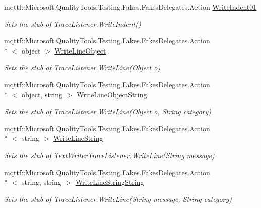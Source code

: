 \begin{DoxyCompactItemize}
mqttf\-::\-Microsoft.\-Quality\-Tools.\-Testing.\-Fakes.\-Fakes\-Delegates.\-Action \hyperlink{class_system_1_1_diagnostics_1_1_fakes_1_1_stub_console_trace_listener_aab8718be0e682706b76f757c57e13164}{Write\-Indent01}
\begin{DoxyCompactList}\small\item\em Sets the stub of Trace\-Listener.\-Write\-Indent()\end{DoxyCompactList}\item 
mqttf\-::\-Microsoft.\-Quality\-Tools.\-Testing.\-Fakes.\-Fakes\-Delegates.\-Action\\*
$<$ object $>$ \hyperlink{class_system_1_1_diagnostics_1_1_fakes_1_1_stub_console_trace_listener_a40de8646092fef37436942df0c258a27}{Write\-Line\-Object}
\begin{DoxyCompactList}\small\item\em Sets the stub of Trace\-Listener.\-Write\-Line(\-Object o)\end{DoxyCompactList}\item 
mqttf\-::\-Microsoft.\-Quality\-Tools.\-Testing.\-Fakes.\-Fakes\-Delegates.\-Action\\*
$<$ object, string $>$ \hyperlink{class_system_1_1_diagnostics_1_1_fakes_1_1_stub_console_trace_listener_a6ec0970fc9b34384f08e9f5ccda591e4}{Write\-Line\-Object\-String}
\begin{DoxyCompactList}\small\item\em Sets the stub of Trace\-Listener.\-Write\-Line(\-Object o, String category)\end{DoxyCompactList}\item 
mqttf\-::\-Microsoft.\-Quality\-Tools.\-Testing.\-Fakes.\-Fakes\-Delegates.\-Action\\*
$<$ string $>$ \hyperlink{class_system_1_1_diagnostics_1_1_fakes_1_1_stub_console_trace_listener_adfd7c795a096ce28ed650c39c929baee}{Write\-Line\-String}
\begin{DoxyCompactList}\small\item\em Sets the stub of Text\-Writer\-Trace\-Listener.\-Write\-Line(\-String message)\end{DoxyCompactList}\item 
mqttf\-::\-Microsoft.\-Quality\-Tools.\-Testing.\-Fakes.\-Fakes\-Delegates.\-Action\\*
$<$ string, string $>$ \hyperlink{class_system_1_1_diagnostics_1_1_fakes_1_1_stub_console_trace_listener_a52bbf798dca2c40a21c459990e397b9e}{Write\-Line\-String\-String}
\begin{DoxyCompactList}\small\item\em Sets the stub of Trace\-Listener.\-Write\-Line(\-String message, String category)\end{DoxyCompactList}\item 

\end{DoxyCompactItemize}
